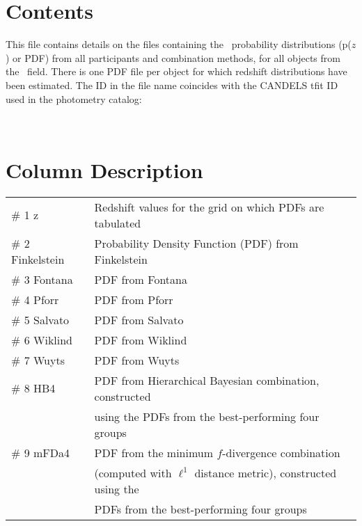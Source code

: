 \section*{Contents}
This file contains details on the files containing the \photoz\ probability distributions (p($z$) or PDF) from all participants and combination methods, for all objects from the \field\ field.  There is one PDF file per object for which redshift distributions have been estimated. The ID in the file name coincides with the CANDELS tfit ID used in the photometry catalog:

\photomcat\

\section*{Column Description}

\begin{center}
\begin{tabular}{ll}
\# 1 z            &	 Redshift values for the grid on which PDFs are tabulated \\
\# 2 Finkelstein  &  Probability Density Function (PDF) from Finkelstein \\
\# 3 Fontana 	  &	 PDF from Fontana \\
\# 4 Pforr 		  &	 PDF from Pforr \\
\# 5 Salvato 	  &	 PDF from Salvato \\
\# 6 Wiklind 	  &	 PDF from Wiklind \\
\# 7 Wuyts 		  &	 PDF from Wuyts \\
\# 8 HB4	  	  &	 PDF from Hierarchical Bayesian combination, constructed\\
                  &  using the PDFs from the best-performing four groups \\
\# 9 mFDa4	 	  &	 PDF from the minimum $f$-divergence combination\\
                  &  (computed with $\ell^1$ distance metric), constructed using the\\
                  &  PDFs from the best-performing four groups\\
\end{tabular}
\end{center}




